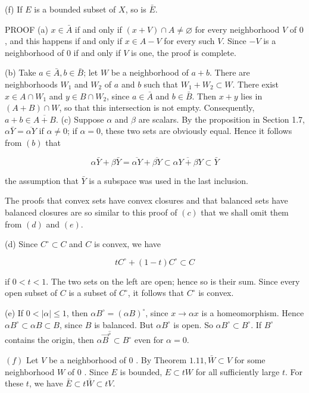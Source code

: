 \documentclass[10pt]{article}
\begin{document}
(f) If $E$ is a bounded subset of $X$, so is $\bar{E}$.

PROOF (a) $x \in \bar{A}$ if and only if $(x+V) \cap A \neq \varnothing$ for every neighborhood $V$ of 0 , and this happens if and only if $x \in A-V$ for every such $V$. Since $-V$ is a neighborhood of 0 if and only if $V$ is one, the proof is complete.

(b) Take $a \in \bar{A}, b \in \bar{B}$; let $W$ be a neighborhood of $a+b$. There are neighborhoods $W_{1}$ and $W_{2}$ of $a$ and $b$ such that $W_{1}+W_{2} \subset W$. There exist $x \in A \cap W_{1}$ and $y \in B \cap W_{2}$, since $a \in \bar{A}$ and $b \in \bar{B}$. Then $x+y$ lies in $(A+B) \cap W$, so that this intersection is not empty. Consequently, $a+b \in \overline{A+B}$. (c) Suppose $\alpha$ and $\beta$ are scalars. By the proposition in Section 1.7, $\alpha \bar{Y}=\overline{\alpha Y}$ if $\alpha \neq 0$; if $\alpha=0$, these two sets are obviously equal. Hence it follows from $(b)$ that

$$
\alpha \bar{Y}+\beta \bar{Y}=\overline{\alpha Y}+\overline{\beta Y} \subset \overline{\alpha Y+\beta Y} \subset \bar{Y}
$$

the assumption that $\bar{Y}$ is a subspace was used in the last inclusion.

The proofs that convex sets have convex closures and that balanced sets have balanced closures are so similar to this proof of $(c)$ that we shall omit them from $(d)$ and $(e)$.

(d) Since $C^{\circ} \subset C$ and $C$ is convex, we have

$$
t C^{\circ}+(1-t) C^{\circ} \subset C
$$

if $0<t<1$. The two sets on the left are open; hence so is their sum. Since every open subset of $C$ is a subset of $C^{\circ}$, it follows that $C^{\circ}$ is convex.

(e) If $0<|\alpha| \leq 1$, then $\alpha B^{\circ}=(\alpha B)^{\circ}$, since $x \rightarrow \alpha x$ is a homeomorphism. Hence $\alpha B^{\circ} \subset \alpha B \subset B$, since $B$ is balanced. But $\alpha B^{\circ}$ is open. So $\alpha B^{\circ} \subset B^{\circ}$. If $B^{\circ}$ contains the origin, then $\alpha \vec{B}^{\hat{\circ}} \subset B^{\circ}$ even for $\alpha=0$.

$(f)$ Let $V$ be a neighborhood of 0 . By Theorem $1.11, \bar{W} \subset V$ for some neighborhood $W$ of 0 . Since $E$ is bounded, $E \subset t W$ for all sufficiently large $t$. For these $t$, we have $\bar{E} \subset t \bar{W} \subset t V$.
\end{document}
